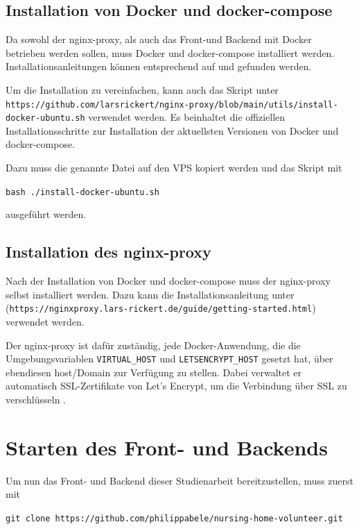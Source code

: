 \subsection{Installation von Docker und docker-compose}
Da sowohl der nginx-proxy, als auch das Front-und Backend mit Docker betrieben werden sollen, muss Docker und docker-compose installiert werden. Installationsanleitungen können entsprechend auf \cite{DockerInstallation} und \cite{DockerDomposeInstallation} gefunden werden.

Um die Installation zu vereinfachen, kann auch das Skript unter \lstinline{https://github.com/larsrickert/nginx-proxy/blob/main/utils/install-docker-ubuntu.sh} verwendet werden. Es beinhaltet die offiziellen Installationsschritte zur Installation der aktuellsten Versionen von Docker und docker-compose.

Dazu muss die genannte Datei auf den \ac{VPS} kopiert werden und das Skript mit

\begin{center}
  \lstinline{bash ./install-docker-ubuntu.sh}
\end{center}

ausgeführt werden.

\subsection{Installation des nginx-proxy}
Nach der Installation von Docker und docker-compose muss der nginx-proxy selbst installiert werden. Dazu kann die Installationsanleitung unter \cite{NginxProxyInstallation} (\lstinline{https://nginxproxy.lars-rickert.de/guide/getting-started.html}) verwendet werden.

Der nginx-proxy ist dafür zuständig, jede Docker-Anwendung, die die Umgebungsvariablen \lstinline{VIRTUAL_HOST} und \lstinline{LETSENCRYPT_HOST} gesetzt hat, über ebendiesen host/Domain zur Verfügung zu stellen. Dabei verwaltet er automatisch SSL-Zertifikate von Let's Encrypt, um die Verbindung über SSL zu verschlüsseln \cite{NginxProxyInstallation}.

\section{Starten des Front- und Backends}
\label{sec:start-applications}
Um nun das Front- und Backend dieser Studienarbeit bereitzustellen, muss zuerst mit

\begin{center}
  \lstinline{git clone https://github.com/philippabele/nursing-home-volunteer.git}
\end{center}

